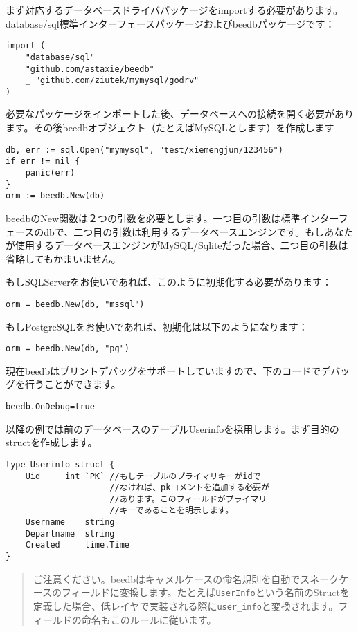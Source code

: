 まず対応するデータベースドライバパッケージをimportする必要があります。database/sql標準インターフェースパッケージおよびbeedbパッケージです：

\begin{lstlisting}[numbers=none]
import (
    "database/sql"
    "github.com/astaxie/beedb"
    _ "github.com/ziutek/mymysql/godrv"
)
\end{lstlisting}

必要なパッケージをインポートした後、データベースへの接続を開く必要があります。その後beedbオブジェクト（たとえばMySQLとします）を作成します


\begin{lstlisting}[numbers=none]
db, err := sql.Open("mymysql", "test/xiemengjun/123456")
if err != nil {
    panic(err)
}
orm := beedb.New(db)
\end{lstlisting}

beedbのNew関数は２つの引数を必要とします。一つ目の引数は標準インターフェースのdbで、二つ目の引数は利用するデータベースエンジンです。もしあなたが使用するデータベースエンジンがMySQL/Sqliteだった場合、二つ目の引数は省略してもかまいません。

もしSQLServerをお使いであれば、このように初期化する必要があります：

\begin{lstlisting}[numbers=none]
orm = beedb.New(db, "mssql")
\end{lstlisting}

もしPostgreSQLをお使いであれば、初期化は以下のようになります：

\begin{lstlisting}[numbers=none]
orm = beedb.New(db, "pg")
\end{lstlisting}

現在beedbはプリントデバッグをサポートしていますので、下のコードでデバッグを行うことができます。

\begin{lstlisting}[numbers=none]
beedb.OnDebug=true
\end{lstlisting}

以降の例では前のデータベースのテーブルUserinfoを採用します。まず目的のstructを作成します。

\begin{lstlisting}[numbers=none]
type Userinfo struct {
    Uid     int `PK` //もしテーブルのプライマリキーがidで
                     //なければ、pkコメントを追加する必要が
                     //あります。このフィールドがプライマリ
                     //キーであることを明示します。
    Username    string
    Departname  string
    Created     time.Time
}
\end{lstlisting}

\begin{quote}
ご注意ください。beedbはキャメルケースの命名規則を自動でスネークケースのフィールドに変換します。たとえば\texttt{UserInfo}という名前のStructを定義した場合、低レイヤで実装される際に\texttt{user\_info}と変換されます。フィールドの命名もこのルールに従います。
\end{quote}
